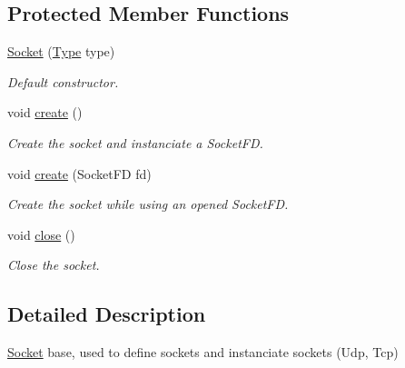 \subsection*{Protected Member Functions}
\begin{DoxyCompactItemize}
\item 
\hyperlink{classmognetwork_1_1_socket_a27ed1b1c76de76da577ccbf5b0b687ef}{Socket} (\hyperlink{classmognetwork_1_1_socket_a70fb1fd697cfe89987e81bbe9db8ea4d}{Type} type)
\begin{DoxyCompactList}\small\item\em Default constructor. \end{DoxyCompactList}\item 
\hypertarget{classmognetwork_1_1_socket_a442e315822bc0fbeeb7c5669a0dceacc}{void \hyperlink{classmognetwork_1_1_socket_a442e315822bc0fbeeb7c5669a0dceacc}{create} ()}\label{classmognetwork_1_1_socket_a442e315822bc0fbeeb7c5669a0dceacc}

\begin{DoxyCompactList}\small\item\em Create the socket and instanciate a Socket\-F\-D. \end{DoxyCompactList}\item 
\hypertarget{classmognetwork_1_1_socket_a60e3f8b01b89ba0ce03c24ac92e4be0d}{void \hyperlink{classmognetwork_1_1_socket_a60e3f8b01b89ba0ce03c24ac92e4be0d}{create} (Socket\-F\-D fd)}\label{classmognetwork_1_1_socket_a60e3f8b01b89ba0ce03c24ac92e4be0d}

\begin{DoxyCompactList}\small\item\em Create the socket while using an opened Socket\-F\-D. \end{DoxyCompactList}\item 
\hypertarget{classmognetwork_1_1_socket_a7e8f6bc7f729be6cf1d8c1d5dd638a0b}{void \hyperlink{classmognetwork_1_1_socket_a7e8f6bc7f729be6cf1d8c1d5dd638a0b}{close} ()}\label{classmognetwork_1_1_socket_a7e8f6bc7f729be6cf1d8c1d5dd638a0b}

\begin{DoxyCompactList}\small\item\em Close the socket. \end{DoxyCompactList}\end{DoxyCompactItemize}


\subsection{Detailed Description}
\hyperlink{classmognetwork_1_1_socket}{Socket} base, used to define sockets and instanciate sockets (Udp, Tcp) 

